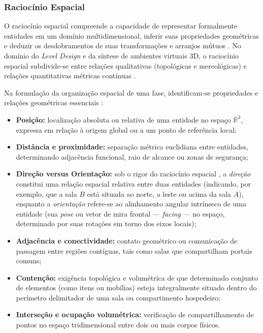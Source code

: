 \subsubsection{Raciocínio Espacial}
\label{sec:raciocinio_espacial}

O raciocínio espacial compreende a capacidade de representar formalmente entidades em um domínio multidimensional, inferir suas propriedades geométricas e deduzir os desdobramentos de suas transformações e arranjos mútuos \cite{cohn2008qualitative, sun2024roomplanner, xu2025constraint}. No domínio do \textit{Level Design} e da síntese de ambientes virtuais 3D, o raciocínio espacial subdivide-se entre relações qualitativas (topológicas e mereológicas) \cite{cohn2008qualitative} e relações quantitativas métricas contínuas \cite{xu2025constraint, chen2025narrative}.

Na formulação da organização espacial de uma fase, identificam-se propriedades e relações geométricas essenciais \cite{cohn2008qualitative, sun2024roomplanner, xu2025constraint, chen2025narrative}:
\begin{itemize}
    \item \textbf{Posição:} localização absoluta ou relativa de uma entidade no espaço $\mathbb{R}^3$, expressa em relação à origem global ou a um ponto de referência local;
    \item \textbf{Distância e proximidade:} separação métrica euclidiana entre entidades, determinando adjacência funcional, raio de alcance ou zonas de segurança;
    \item \textbf{Direção versus Orientação:} sob o rigor do raciocínio espacial \cite{cohn2008qualitative}, a \textit{direção} constitui uma relação espacial relativa entre duas entidades (indicando, por exemplo, que a sala $B$ está situada ao norte, a leste ou acima da sala $A$), enquanto a \textit{orientação} refere-se ao alinhamento angular intrínseco de uma entidade (sua \textit{pose} ou vetor de mira frontal --- \textit{facing} --- no espaço, determinado por suas rotações em torno dos eixos locais);
    \item \textbf{Adjacência e conectividade:} contato geométrico ou comunicação de passagem entre regiões contíguas, tais como salas que compartilham portais comuns;
    \item \textbf{Contenção:} exigência topológica e volumétrica de que determinado conjunto de elementos (como itens ou mobílias) esteja integralmente situado dentro do perímetro delimitador de uma sala ou compartimento hospedeiro;
    \item \textbf{Interseção e ocupação volumétrica:} verificação de compartilhamento de pontos no espaço tridimensional entre dois ou mais corpos físicos.
\end{itemize}

